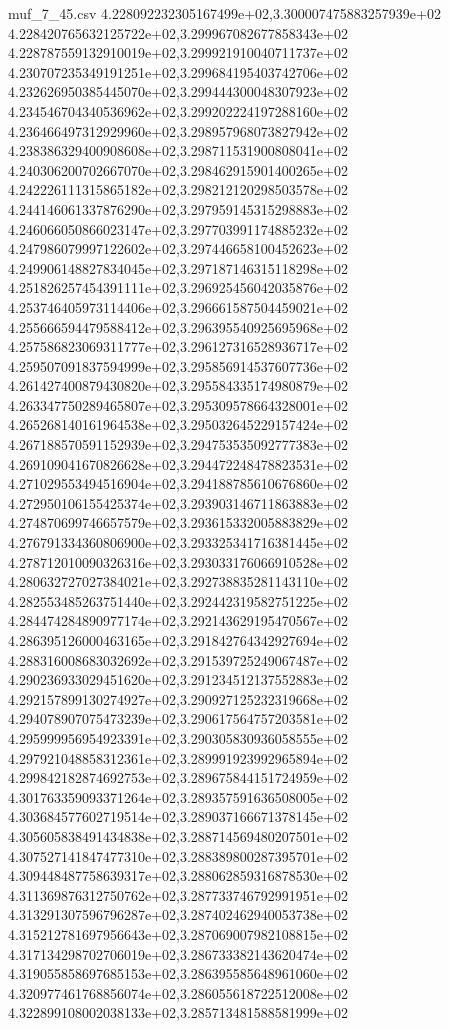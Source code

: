 \begin{filecontents*}{muf_7_45.csv}
4.228092232305167499e+02,3.300007475883257939e+02
4.228420765632125722e+02,3.299967082677858343e+02
4.228787559132910019e+02,3.299921910040711737e+02
4.230707235349191251e+02,3.299684195403742706e+02
4.232626950385445070e+02,3.299444300048307923e+02
4.234546704340536962e+02,3.299202224197288160e+02
4.236466497312929960e+02,3.298957968073827942e+02
4.238386329400908608e+02,3.298711531900808041e+02
4.240306200702667070e+02,3.298462915901400265e+02
4.242226111315865182e+02,3.298212120298503578e+02
4.244146061337876290e+02,3.297959145315298883e+02
4.246066050866023147e+02,3.297703991174885232e+02
4.247986079997122602e+02,3.297446658100452623e+02
4.249906148827834045e+02,3.297187146315118298e+02
4.251826257454391111e+02,3.296925456042035876e+02
4.253746405973114406e+02,3.296661587504459021e+02
4.255666594479588412e+02,3.296395540925695968e+02
4.257586823069311777e+02,3.296127316528936717e+02
4.259507091837594999e+02,3.295856914537607736e+02
4.261427400879430820e+02,3.295584335174980879e+02
4.263347750289465807e+02,3.295309578664328001e+02
4.265268140161964538e+02,3.295032645229157424e+02
4.267188570591152939e+02,3.294753535092777383e+02
4.269109041670826628e+02,3.294472248478823531e+02
4.271029553494516904e+02,3.294188785610676860e+02
4.272950106155425374e+02,3.293903146711863883e+02
4.274870699746657579e+02,3.293615332005883829e+02
4.276791334360806900e+02,3.293325341716381445e+02
4.278712010090326316e+02,3.293033176066910528e+02
4.280632727027384021e+02,3.292738835281143110e+02
4.282553485263751440e+02,3.292442319582751225e+02
4.284474284890977174e+02,3.292143629195470567e+02
4.286395126000463165e+02,3.291842764342927694e+02
4.288316008683032692e+02,3.291539725249067487e+02
4.290236933029451620e+02,3.291234512137552883e+02
4.292157899130274927e+02,3.290927125232319668e+02
4.294078907075473239e+02,3.290617564757203581e+02
4.295999956954923391e+02,3.290305830936058555e+02
4.297921048858312361e+02,3.289991923992965894e+02
4.299842182874692753e+02,3.289675844151724959e+02
4.301763359093371264e+02,3.289357591636508005e+02
4.303684577602719514e+02,3.289037166671378145e+02
4.305605838491434838e+02,3.288714569480207501e+02
4.307527141847477310e+02,3.288389800287395701e+02
4.309448487758639317e+02,3.288062859316878530e+02
4.311369876312750762e+02,3.287733746792991951e+02
4.313291307596796287e+02,3.287402462940053738e+02
4.315212781697956643e+02,3.287069007982108815e+02
4.317134298702706019e+02,3.286733382143620474e+02
4.319055858697685153e+02,3.286395585648961060e+02
4.320977461768856074e+02,3.286055618722512008e+02
4.322899108002038133e+02,3.285713481588581999e+02

\end{filecontents*}
